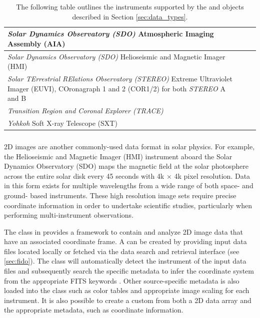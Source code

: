 \begin{table}
\begin{center}
\begin{tabular}{|p{12cm}|c|c|}
\hline
\textit{Solar Dynamics Observatory (SDO)} Atmospheric Imaging Assembly (AIA) & \citet{lemen2012} \\
\hline
\textit{Solar Dynamics Observatory (SDO)} Helioseismic and Magnetic Imager (HMI) & \citet{schou12}  \\
\hline
\textit{Solar TErrestrial RElations Observatory (STEREO)} Extreme Ultraviolet Imager (EUVI), COronagraph 1 and 2 (COR1/2) for both \textit{STEREO} A and B & \citet{howard2008sun} \\
\hline
\textit{Transition Region and Coronal Explorer (TRACE)}  & \citet{handy99}  \\
\hline
\textit{Yohkoh} Soft X-ray Telescope (SXT) & \citet{tsuneta1991soft}  \\
\hline
\end{tabular}
\end{center}
\caption{The following table outlines the instruments supported by the \Timeseries and \Map objects described in Section \ref{sec:data_types}.}
\label{tab:instruments}
\end{table}

\subsubsection{\Map}
\label{sec:map}
2D images are another commonly-used data format in solar physics. 
For example, the Helioseismic and Magnetic Imager (HMI) instrument aboard the Solar Dynamics Observatory (SDO) maps the magnetic field at the solar photosphere across the entire solar disk every 45 seconds with 4k $\times$ 4k pixel resolution.
Data in this form exists for multiple wavelengths from a wide range of both space- and ground- based instruments.
These high resolution image sets require precise coordinate information in order to undertake scientific studies, particularly when performing multi-instrument observations. 

The \Map class in \sunpypkg provides a framework to contain and analyze 2D image data that have an associated coordinate frame. 
A \Map can be created by providing input data files located locally or fetched via the \sunpypkg data search and retrieval interface \Fido (see \autoref{sec:fido}).
The \Map class will automatically detect the instrument of the input data files and subsequently search the specific metadata to infer the coordinate system from the appropriate FITS keywords \citep{refId0, 2006A&A...449..791T}.
Other source-specific metadata is also loaded into the \Map class such as color tables and appropriate image scaling for each instrument.
It is also possible to create a custom \Map from both a 2D data array and the appropriate metadata, such as coordinate information.

